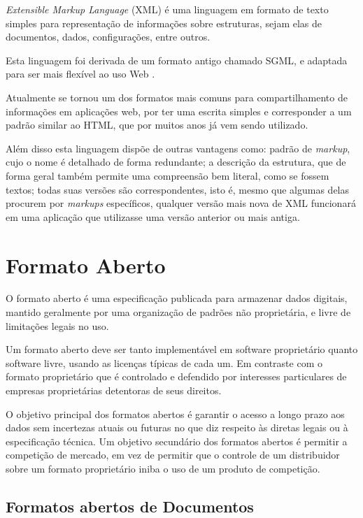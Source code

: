 \textit{Extensible Markup Language} (XML) é uma linguagem em formato de texto simples para representação de informações sobre estruturas, sejam elas de documentos, dados, configurações, entre outros. 

Esta linguagem foi derivada de um formato antigo chamado SGML, e adaptada para ser mais flexível ao uso Web \cite{W3C-XML}.

Atualmente se tornou um dos formatos mais comuns para compartilhamento de informações em aplicações web, por ter uma escrita simples e corresponder a um padrão similar ao HTML, que por muitos anos já vem sendo utilizado.

Além disso esta linguagem dispõe de outras vantagens como: padrão de \textit{markup}, cujo o nome é detalhado de forma redundante; a descrição da estrutura, que de forma geral também permite uma compreensão bem literal, como se fossem textos; todas suas versões são correspondentes, isto é, mesmo que algumas delas procurem por \textit{markups} específicos, qualquer versão mais nova de XML funcionará em uma aplicação que utilizasse uma versão anterior ou mais antiga.


\section{Formato Aberto}

O formato aberto é uma especificação publicada para armazenar dados digitais, mantido geralmente por uma organização de padrões não proprietária, e livre de limitações legais no uso.

Um formato aberto deve ser tanto implementável em software proprietário quanto software livre, usando as licenças típicas de cada um. Em contraste com o formato proprietário que é controlado e defendido por interesses particulares de empresas proprietárias detentoras de seus direitos.

O objetivo principal dos formatos abertos é garantir o acesso a longo prazo aos dados sem incertezas atuais ou futuras no que diz respeito às diretas legais ou à especificação técnica. Um objetivo secundário dos formatos abertos é permitir a competição de mercado, em vez de permitir que o controle de um distribuidor sobre um formato proprietário iniba o uso de um produto de competição.

\subsection{Formatos abertos de Documentos}
\label{documentos}

